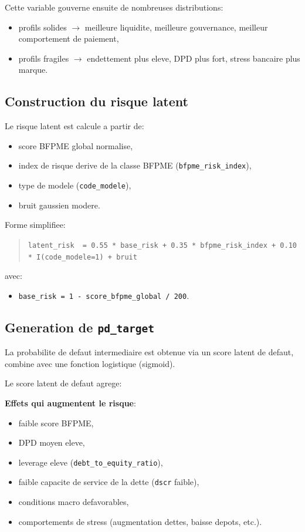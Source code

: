 \documentclass[11pt,a4paper]{article}
\begin{document}
Cette variable gouverne ensuite de nombreuses distributions:
\begin{itemize}[leftmargin=1.2cm]
  \item profils solides $\rightarrow$ meilleure liquidite, meilleure gouvernance, meilleur comportement de paiement,
  \item profils fragiles $\rightarrow$ endettement plus eleve, DPD plus fort, stress bancaire plus marque.
\end{itemize}

\subsection{Construction du risque latent}

Le risque latent est calcule a partir de:
\begin{itemize}[leftmargin=1.2cm]
  \item score BFPME global normalise,
  \item index de risque derive de la classe BFPME (\texttt{bfpme\_risk\_index}),
  \item type de modele (\texttt{code\_modele}),
  \item bruit gaussien modere.
\end{itemize}

Forme simplifiee:
\begin{quote}
\texttt{latent\_risk ~= 0.55 * base\_risk + 0.35 * bfpme\_risk\_index + 0.10 * I(code\_modele=1) + bruit}
\end{quote}

avec:
\begin{itemize}[leftmargin=1.2cm]
  \item \texttt{base\_risk = 1 - score\_bfpme\_global / 200}.
\end{itemize}

\subsection{Generation de \texttt{pd\_target}}

La probabilite de defaut intermediaire est obtenue via un score latent de defaut, combine avec une fonction logistique (sigmoid).

Le score latent de defaut agrege:

\textbf{Effets qui augmentent le risque}:
\begin{itemize}[leftmargin=1.2cm]
  \item faible score BFPME,
  \item DPD moyen eleve,
  \item leverage eleve (\texttt{debt\_to\_equity\_ratio}),
  \item faible capacite de service de la dette (\texttt{dscr} faible),
  \item conditions macro defavorables,
  \item comportements de stress (augmentation dettes, baisse depots, etc.).
\end{itemize}
\end{document}
